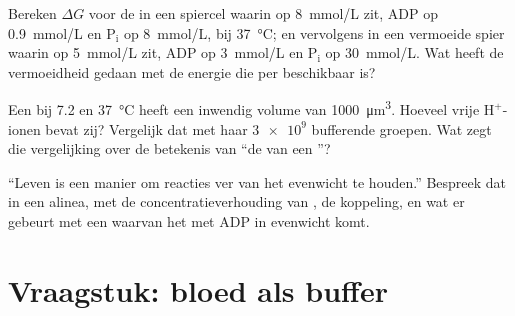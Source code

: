 \begin{exercise}[$\star\star\star$]\label{exo:b1:water-small-molecules:10}
Bereken $\Delta G$ voor de  in een spiercel waarin  op
\qty{8}{mmol/L} zit, ADP op \qty{0.9}{mmol/L} en $\mathrm{P_i}$ op
\qty{8}{mmol/L}, bij \qty{37}{\celsius}; en vervolgens in een vermoeide spier
waarin  op \qty{5}{mmol/L} zit, ADP op \qty{3}{mmol/L} en $\mathrm{P_i}$ op
\qty{30}{mmol/L}. Wat heeft de vermoeidheid gedaan met de energie die per 
beschikbaar is?
\end{exercise}

\begin{exercise}[$\star\star\star$]\label{exo:b1:water-small-molecules:11}
Een  bij  7.2 en \qty{37}{\celsius} heeft een inwendig volume van
\qty{1000}{\micro m^3}. Hoeveel vrije $\mathrm{H^+}$-ionen bevat zij? Vergelijk
dat met haar $\num{3e9}$ bufferende groepen. Wat zegt die vergelijking over de
betekenis van ``de  van een ''?
\end{exercise}

\begin{exercise}[$\star\star\star$]\label{exo:b1:water-small-molecules:12}
``Leven is een manier om reacties ver van het evenwicht te houden.'' Bespreek dat
in een alinea, met de concentratieverhouding van , de koppeling, en wat er
gebeurt met een  waarvan het  met ADP in evenwicht komt.
\end{exercise}

\section{Vraagstuk: bloed als buffer}

